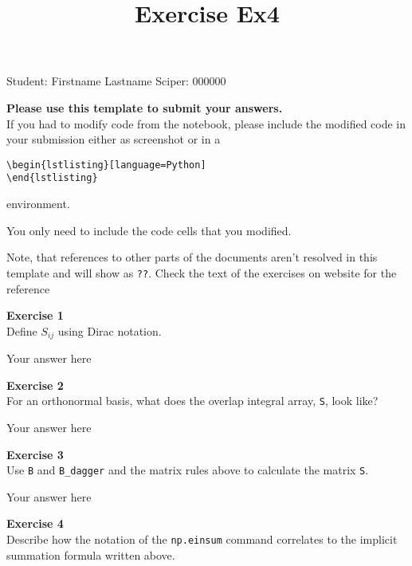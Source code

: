 \documentclass{article}
\title{Exercise Ex4}
\begin{document}
\maketitle\maketitle

Student:  Firstname Lastname    Sciper: 000000

\begin{mdframed}
\textbf{Please use this template to submit your answers.}\\
If you had to modify code from the notebook, please include the modified code in your submission either as screenshot or in a

\begin{verbatim}
\begin{lstlisting}[language=Python]
\end{lstlisting}
\end{verbatim}

environment.

You only need to include the code cells that you modified.

Note, that references to other parts of the documents aren't resolved in this template and will show as \texttt{??}. Check the text of the exercises on website for the reference
\end{mdframed}

\begin{mdframed}
\textbf{Exercise 1}\\
Define $S_{ij}$ using Dirac notation.
\end{mdframed}

Your answer here

\begin{mdframed}
\textbf{Exercise 2}\\
For an orthonormal basis, what does the overlap integral array, \texttt{S}, look like?
\end{mdframed}

Your answer here

\begin{mdframed}
\textbf{Exercise 3}\\
Use \texttt{B} and \texttt{B\_dagger} and the matrix rules above to calculate the matrix \texttt{S}.
\end{mdframed}

Your answer here

\begin{mdframed}
\textbf{Exercise 4}\\
Describe how the notation of the \texttt{np.einsum} command correlates to the implicit summation formula written above.
\end{mdframed}
\end{document}
